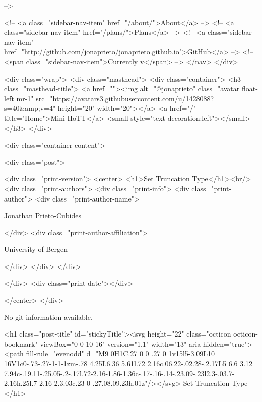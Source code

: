       
     -->

    <!-- <a class="sidebar-nav-item" href="/about/">About</a> -->
    <!-- <a class="sidebar-nav-item" href="/plans/">Plans</a> -->
    <!-- <a class="sidebar-nav-item" href="http://github.com/jonaprieto/jonaprieto.github.io">GitHub</a> -->
    <!-- <span class="sidebar-nav-item">Currently v</span> -->
  </nav>
</div>

    <div class="wrap">
      <div class="masthead">
        <div class="container">
          <h3 class="masthead-title">
            <a href=""><img alt="@jonaprieto" class="avatar float-left mr-1" src="https://avatars3.githubusercontent.com/u/1428088?s=40&amp;v=4" height="20" width="20"></a>
            <a href="/" title="Home">Mini-HoTT</a>
            <small style="text-decoration:left"></small>
          </h3>
        </div>
      
      <div class="container content">
        







<div class="post">

  <div class="print-version">
    <center>
      <h1>Set Truncation Type</h1><br/>
        <div class="print-authors">
          <div class="print-info">
            <div class="print-author">
              <div class="print-author-name">
                
                  Jonathan Prieto-Cubides
                
              </div>
              <div class="print-author-affiliation">
                
                  University of Bergen
                
                </div>
            </div>
          </div>
          
          
        </div>
        <div class="print-date"></div>
        
        
    </center>
  </div>

  
  No git information available.
  
  <h1 class="post-title" id="stickyTitle"><svg height="22" class="octicon octicon-bookmark" viewBox="0 0 10 16" version="1.1" width="13" aria-hidden="true"><path fill-rule="evenodd" d="M9 0H1C.27 0 0 .27 0 1v15l5-3.09L10 16V1c0-.73-.27-1-1-1zm-.78 4.25L6.36 5.61l.72 2.16c.06.22-.02.28-.2.17L5 6.6 3.12 7.94c-.19.11-.25.05-.2-.17l.72-2.16-1.86-1.36c-.17-.16-.14-.23.09-.23l2.3-.03.7-2.16h.25l.7 2.16 2.3.03c.23 0 .27.08.09.23h.01z"/></svg> Set Truncation Type
  </h1>

